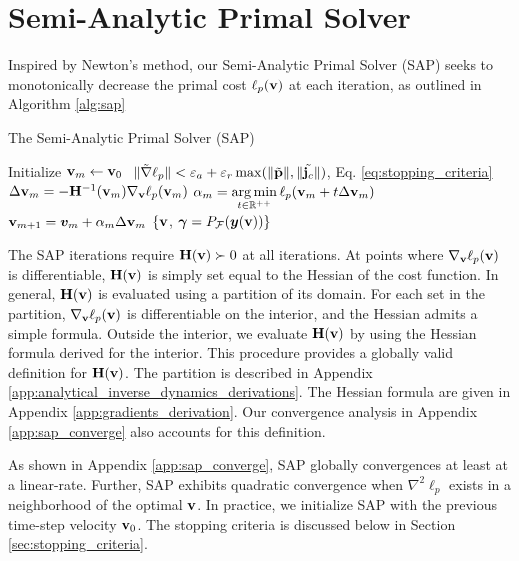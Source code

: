 
\section{Semi-Analytic Primal Solver}
\label{sec:sap_solver}

Inspired by Newton's method, our Semi-Analytic Primal Solver (SAP) seeks to monotonically decrease the primal cost $\ell_p({\mathbf{v}})$ at each iteration, as outlined in Algorithm \ref{alg:sap}
\begin{algorithm}[H]
	\caption{The Semi-Analytic Primal Solver (SAP)}	
	  \label{alg:sap}
	  \begin{algorithmic}[1]
		  \State Initialize ${\mathbf{v}}_m \gets {\mathbf{v}}_0$
		  \RepeatUntil $~\Vert\tilde{\nabla}\ell_p\Vert < \varepsilon_a + \varepsilon_r\max(\Vert\tilde{{\mathbf{p}}}\Vert,\Vert\tilde{{\mathbf{j}}_c}\Vert)$, Eq. \eqref{eq:stopping_criteria}
			  \State $\Delta{\mathbf{v}}_{m} = -{\mathbf{H}}^{-1}({\mathbf{v}}_m)\nabla_{\mathbf{v}}\ell_p({\mathbf{v}}_m)$ \label{op:Newton_iteration}
			  \State $\displaystyle \alpha_m = \operatorname*{arg\,min}_{t\in\mathbb{R}^{++}} \ell_p({\mathbf{v}}_m + t \Delta{\mathbf{v}}_{m})$
			  \State $\displaystyle {\mathbf{v}}_{m+1} = {\bm{v}}_m + \alpha_{m}\Delta{\mathbf{v}}_{m}$
		  \EndRepeatUntil
		  \State\Return $\{{\mathbf{v}}$, ${\bm\gamma}=P_\mathcal{F}({\bm{y}}({\mathbf{v}}))\}$
	  \end{algorithmic}
\end{algorithm}

The SAP iterations require ${\mathbf{H}}({\mathbf{v}})\succ 0$ at all iterations.  At points
where $\nabla_{\mathbf{v}}\ell_p({\mathbf{v}})$ is differentiable, ${\mathbf{H}}({\mathbf{v}})$ is
simply set equal to the Hessian of the
cost function. In general, ${\mathbf{H}}({\mathbf{v}})$ is evaluated using a partition of its
domain. For each set in the partition, $\nabla_{\mathbf{v}}\ell_p({\mathbf{v}})$ is differentiable on the
interior, and the Hessian admits a simple formula. Outside the interior, we
evaluate ${\mathbf{H}}({\mathbf{v}})$ by using the Hessian formula derived for the interior.
This procedure provides a globally valid definition for ${\mathbf{H}}({\mathbf{v}})$. The
partition is described in Appendix
\ref{app:analytical_inverse_dynamics_derivations}. The Hessian formula are given
in Appendix \ref{app:gradients_derivation}. Our convergence analysis in Appendix
\ref{app:sap_converge} also accounts for this definition.

As shown in Appendix \ref{app:sap_converge}, SAP globally convergences at least
at a linear-rate. Further, SAP exhibits quadratic convergence when $\nabla^2
\ell_p$ exists in a neighborhood of the optimal ${\mathbf{v}}$. In practice, we
initialize SAP with the previous time-step velocity ${\mathbf{v}}_0$. The stopping
criteria is discussed below in Section \ref{sec:stopping_criteria}.

